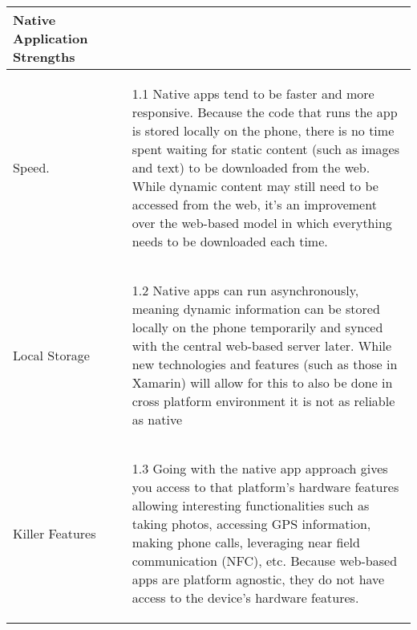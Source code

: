 \begin{center}
\begin{tabularx}{\textwidth}[t]{XX}
\arrayrulecolor{green}\hline
\textbf{\textcolor{myGreen}{Native Application Strengths}} & \\
\hline
Speed. & 
\begin{minipage}[t]{\linewidth}%
\begin{itemize}
\item[1.1] 
Native apps tend to be faster and more responsive. Because the code that runs the app is stored locally on the phone, there is no time spent waiting for static content (such as images and text) to be downloaded from the web. While dynamic content may still need to be accessed from the web, it’s an improvement over the web-based model in which everything needs to be downloaded each time.

\end{itemize} 
\end{minipage}\\

\arrayrulecolor{black}\hline

Local Storage &
\begin{minipage}[t]{\linewidth}%
\begin{itemize}
\item[1.2] Native apps can run asynchronously, meaning dynamic information can be stored locally on the phone temporarily and synced with the central web-based server later. While new technologies and features (such as those in Xamarin) will allow for this to also be done in cross platform environment it is not as reliable as native
\end{itemize} 
\end{minipage}\\

\hline

Killer Features &
\begin{minipage}[t]{\linewidth}%
\begin{itemize}
\item[1.3]  Going with the native app approach gives you access to that platform's hardware features allowing interesting functionalities such as taking photos, accessing GPS information, making phone calls, leveraging near field communication (NFC), etc. Because web-based apps are platform agnostic, they do not have access to the device’s hardware features.
\end{itemize}
\end{minipage}\\


\end{tabularx}
\end{center}
